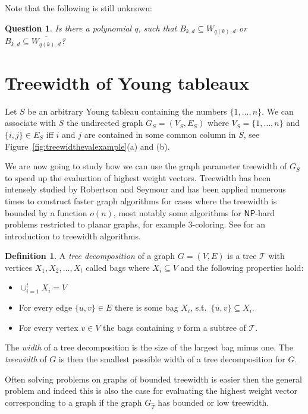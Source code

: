 \documentclass[10pt,a4paper]{article}
\numberwithin{equation}{section}
\newtheorem{question}[equation]{Question}
\theoremstyle{definition}
\newtheorem{definition}[equation]{Definition}
\newcommand{\CT}{\mathcal{T}}
\newcommand{\NP}{\ensuremath{\mathsf{NP}}}
\begin{document}
Note that the following is still unknown:
\begin{question}
    Is there a polynomial $q$, such that $B_{k,d} \subseteq W_{q(k),d}$ or $B_{k,d} \subseteq \overline{W_{q(k),d}}$?
\end{question}

\section{Treewidth of Young tableaux}
\label{sec:treewidth}
Let $S$ be an arbitrary Young tableau containing the numbers $\{1, \ldots, n\}$.
We can associate with $S$ the undirected graph $G_S = (V_S, E_S)$ where $V_S = \{1, \ldots, n\}$ and $\{i, j\} \in E_S$ iff $i$ and $j$ are contained in some common column in $S$, see Figure~\ref{fig:treewidthevalexample}(a) and (b).

We are now going to study how we can use the graph parameter treewidth of $G_S$ to speed up the evaluation of highest weight vectors.
Treewidth has been intensely studied by Robertson and Seymour and has been applied numerous times to construct faster graph algorithms for cases where the treewidth is bounded by a function $o(n)$, most notably some algorithms for $\NP$-hard problems restricted to planar graphs, for example $3$-coloring.
See \cite{cygan2015parameterized} for an introduction to treewidth algorithms.

\begin{definition}\label{def:treedecomp}
    A \emph{tree decomposition} of a graph $G = (V, E)$ is a tree $\CT$ with vertices $X_1, X_2, \ldots, X_t$ called bags where $X_i \subseteq V$ and the following properties hold:
    \begin{itemize}
        \item $\cup_{i=1}^t X_i = V$
        \item For every edge $\{u, v\} \in E$ there is some bag $X_i$, s.t.\ $\{u, v\} \subseteq X_i$.
        \item For every vertex $v \in V$ the bags containing $v$ form a subtree of $\CT$.
    \end{itemize}

    The \emph{width} of a tree decomposition is the size of the largest bag minus one.
    The \emph{treewidth} of $G$ is then the smallest possible width of a tree decomposition for $G$.
\end{definition}

Often solving problems on graphs of bounded treewidth is easier then the general problem and indeed this is also the case for evaluating the highest weight vector corresponding to a graph if the graph $G_{\hat{T}}$ has bounded or low treewidth.
\end{document}
